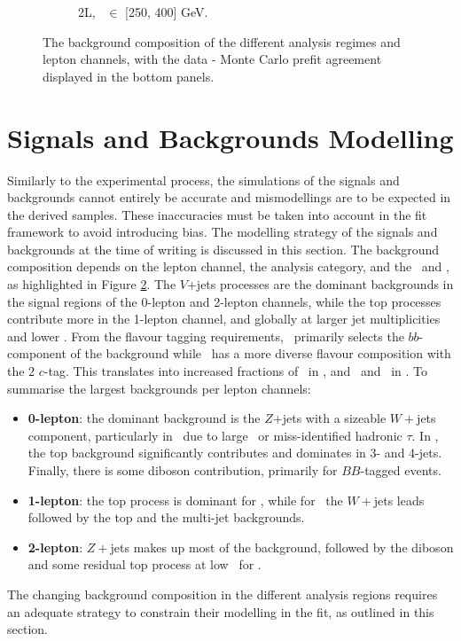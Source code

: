 \begin{figure}[h!]
{\begin{subfigure}[b]{0.37\textwidth}
            \caption{2L, \ptv\ $\in$ [250, 400] GeV.}
            \label{fig:backCom_2L_3}
        \end{subfigure} 
    }
    \caption{The background composition of the different analysis regimes and lepton channels, with the data - Monte Carlo prefit agreement displayed in the bottom panels.}
    \label{fig:backCom}
\end{figure} 

\section{Signals and Backgrounds Modelling}\label{sec-mod}
Similarly to the experimental process, the simulations of the signals and backgrounds cannot entirely be accurate and mismodellings are to be expected in the derived samples. These inaccuracies must be taken into account in the fit framework to avoid introducing bias. The modelling strategy of the signals and backgrounds at the time of writing is discussed in this section. The background composition depends on the lepton channel, the analysis category, and the \ptv\ and \nj, as highlighted in Figure \ref{fig:backCom}. The $V$+jets processes are the dominant backgrounds in the signal regions of the 0-lepton and 2-lepton channels, while the top processes contribute more in the 1-lepton channel, and globally at larger jet multiplicities and lower \ptv. From the flavour tagging requirements, \vhb\ primarily selects the $bb$-component of the background while \vhc\ has a more diverse flavour composition with the 2 $c$-tag. This translates into increased fractions of \vhf\ in \vhb, and \vmf\ and \vlf\ in \vhc. To summarise the largest backgrounds per lepton channels:
\begin{itemize}[leftmargin=*]
    \item \textbf{0-lepton}: the dominant background is the $Z$+jets with a sizeable $W+$jets component, particularly in \vhc\ due to large \etm\ or miss-identified hadronic $\tau$. In \vhb, the top background significantly contributes and dominates in 3- and 4-jets. Finally, there is some diboson contribution, primarily for $BB$-tagged events.
    \item \textbf{1-lepton}: the top process is dominant for \vhb, while for \vhc\ the $W+$jets leads followed by the top and the multi-jet backgrounds.  
    \item \textbf{2-lepton}: $Z+$jets makes up most of the background, followed by the diboson and some residual top process at low \ptv\ for \vhb. 
\end{itemize}
The changing background composition in the different analysis regions requires an adequate strategy to constrain their modelling in the fit, as outlined in this section.
  
